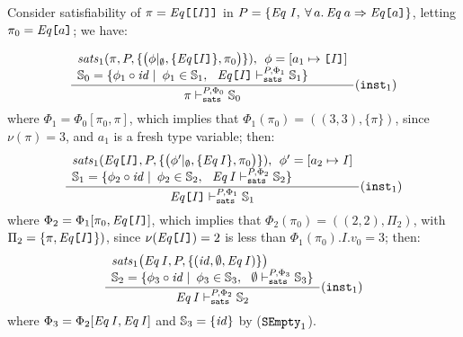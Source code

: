 \begin{Example}
\label{EqL}
{\rm Consider satisfiability of $\pi = \text{{\tt {\it
        Eq\/}[[\text{\it I\/}]]}}$ in $P = \{ \text{\it Eq \text{\it I\/}\/},\: \forall\,
  a.\,\text{\it Eq\/}\: a \Rightarrow \text{{\tt {\it Eq\/}[$a$]}}
  \}$, letting $\pi_0 = \text{{\tt {\it Eq\/}[$a$]}}$; we have:

  \[ \displaystyle\frac{
         \begin{array}{l}
            \textit{sats\/}_1 (\pi,P,
               \{ \bigl( \phi |_\emptyset,
                         \{ \text{\tt{{\it Eq\/}[\text{\it I\/}]}} \}, \pi_0\bigr) \}), \:\: \phi = [a_1\mapsto \text{\tt [\text{\it I\/}]}]\\
               \mathbb{S}_0 = \{ \phi_1\circ {\it id\/} \mid \: \phi_1 \in \mathbb{S}_1,\:\:\:
                \text{\tt{{\it Eq\/}[\text{\it I\/}]}} \vdash_{\texttt{sats}}^{P,\Phi_1} \mathbb{S}_1\}
         \end{array}}
      {\pi \vdash_{\texttt{sats}}^{P,\Phi_0} \mathbb{S}_0} ({\text{\tt inst}}_1)
  \]
where $\Phi_1 = \Phi_0[\pi_0,\pi]$, which implies that $\Phi_1(\pi_0) = ((3, 3), \{ \pi \} )$,  since
      $\nu(\pi) = 3$, and
      $a_1$ is a fresh type variable; then:
  \[ \displaystyle\frac{
         \begin{array}{l}
            \textit{sats\/}_1(\text{\tt {\it Eq\/}[\text{\it I\/}]},P,
              \{\bigl(\phi'|_\emptyset,
                     \{ \text{{\tt {\it Eq\/}}}\,\text{\it I\/} \}, \pi_0\bigr)\}), \:\: \phi' = [a_2\mapsto \text{\it I\/}]\\
            \mathbb{S}_1 = \{ \phi_2\circ {\it id\/} \mid \: \phi_2 \in \mathbb{S}_2,\:\:\:
             \text{\it Eq\/}\,\text{\it I\/} \vdash_{\texttt{sats}}^{P,\Phi_2} \mathbb{S}_2\}
         \end{array}}
      {\text{{\tt {\it Eq\/}[\text{\it I\/}]}} \vdash_{\texttt{sats}}^{P,\Phi_1} \mathbb{S}_1} ({\text{\tt inst}}_1)
  \]
where $\Phi_2 = \Phi_1[\pi_0,\text{\tt {\it Eq\/}[\text{\it I\/}]}]$, which implies that
      $\Phi_2(\pi_0) = ((2,2), \Pi_2)$, with $\Pi_2 = \{ \pi, \text{\tt{\it Eq\/}[\text{\it I\/}]}  \}  )$, since
      $\nu(\text{\tt{\it Eq\/}[\text{\it I\/}]}) = 2$ is less than
       $\Phi_1(\pi_0).I.v_0 = 3$; then:
  \[ \displaystyle\frac{
         \begin{array}{l}
            \textit{sats\/}_1\bigl(\text{\it Eq\/}\,\text{\it I\/},P, \{ ({\it id\/}, \emptyset, \text{\it Eq\/}\,\text{\it I\/} ) \}\bigr)\\
            \mathbb{S}_2 = \{ \phi_3\circ {\it id\/} \mid \: \phi_3 \in \mathbb{S}_3,\:\:\:
            \emptyset \vdash_{\texttt{sats}}^{P,\Phi_3} \mathbb{S}_3\}
         \end{array}}
      {\text{\it Eq\/}\,\text{\it I\/} \vdash_{\texttt{sats}}^{P,\Phi_2} \mathbb{S}_2} ({\text{\tt inst}}_1)
  \]
where $\Phi_3 = \Phi_2[\text{\it Eq\/}\,\text{\it I\/},\text{\it Eq\/}\,\text{\it I\/}]$
      and $\mathbb{S}_3 = \{ {\it id\/}\}$ by ($\text{\tt SEmpty}_1$).}
\end{Example}

